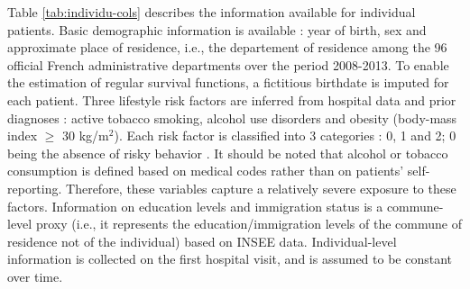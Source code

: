 \documentclass[risks,article,submit,moreauthors,pdftex]{Definitions/mdpi}
\begin{document}
Table \ref{tab:individu-cols} describes the information available for
individual patients. Basic demographic information is available : year
of birth, sex and approximate place of residence, i.e., the departement
of residence among the 96 official French administrative departments
over the period 2008-2013. To enable the estimation of regular survival
functions, a fictitious birthdate is imputed for each patient. Three
lifestyle risk factors are inferred from hospital data and prior
diagnoses : active tobacco smoking, alcohol use disorders and obesity
(body-mass index \(\geq\) 30 kg/m\(^2\)). Each risk factor is classified
into 3 categories : 0, 1 and 2; 0 being the absence of risky behavior
\citep{schwarzinger_contribution_2018}. It should be noted that alcohol
or tobacco consumption is defined based on medical codes rather than on
patients' self-reporting. Therefore, these variables capture a
relatively severe exposure to these factors. Information on education
levels and immigration status is a commune-level proxy (i.e., it
represents the education/immigration levels of the commune of residence
not of the individual) based on INSEE data. Individual-level information
is collected on the first hospital visit, and is assumed to be constant
over time.
\end{document}
